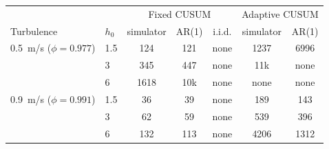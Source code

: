 \begin{tabular}{@{}llccccc@{}}
\toprule
 & & \multicolumn{3}{c}{Fixed CUSUM} & \multicolumn{2}{c}{Adaptive CUSUM} \\
Turbulence & $h_0$ & simulator & AR(1) & i.i.d. & simulator & AR(1) \\
\midrule
0.5~m/s ($\phi=0.977$) & 1.5 & 124 & 121 & none & 1237 & 6996 \\
 & 3 & 345 & 447 & none & 11k & none \\
 & 6 & 1618 & 10k & none & none & none \\
\midrule
0.9~m/s ($\phi=0.991$) & 1.5 & 36 & 39 & none & 189 & 143 \\
 & 3 & 62 & 59 & none & 539 & 396 \\
 & 6 & 132 & 113 & none & 4206 & 1312 \\
\bottomrule
\end{tabular}
